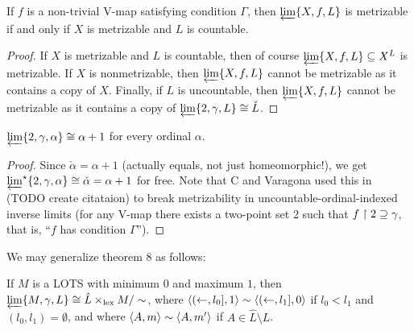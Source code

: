 \documentclass[11pt]{article}
\newcommand{\lexTimes}{\times_{\textrm{lex}}}
\begin{document}
  \begin{corollary}
    If \(f\) is a non-trivial V-map satisfying condition \(\Gamma\), then
    \(\varprojlim \{X, f, L\}\) is metrizable if and only if
    \(X\) is metrizable and \(L\) is countable.
  \end{corollary}

  \begin{proof}
    If \(X\) is metrizable and \(L\) is countable, then of course
    \(\varprojlim \{X,f,L\}\subseteq X^L\) is metrizable. If \(X\) is
    nonmetrizable, then \(\varprojlim \{X,f,L\}\) cannot be metrizable
    as it contains a copy of \(X\). Finally, if \(L\) is uncountable,
    then \(\varprojlim \{X,f,L\}\) cannot be metrizable as it
    contains a copy of \(\varprojlim \{2,\gamma,L\}\cong\check L\).
  \end{proof}

  \begin{corollary}
    \(
      \varprojlim \{2, \gamma, \alpha\}
      \cong
      \alpha+1
    \)
    for every ordinal \(\alpha\).
  \end{corollary}

  \begin{proof}
    Since \(\check\alpha=\alpha+1\) (actually equals, not just homeomorphic!),
    we get \(\varprojlim^\star \{2, \gamma, \alpha\}
      \cong \check\alpha =
    \alpha+1\) for free.
    Note that C and Varagona used this in (TODO create citataion) to break
    metrizability in uncountable-ordinal-indexed inverse limits (for any V-map
    there exists a two-point set \(2\) such that \(f\restriction 2\supseteq\gamma\),
    that is, ``\(f\) has condition \(\Gamma\)'').
  \end{proof}

  \bigskip

  We may generalize theorem 8 as follows:

  \begin{theorem}
    If \(M\) is a LOTS with minimum \(0\) and maximum \(1\),
    then \(\varprojlim\{M,\gamma,L\}\cong \hat L\lexTimes M/\sim\),
    where \(\langle(\leftarrow,l_0],1\rangle\sim\langle(\leftarrow,l_1],0\rangle\) if
    \(l_0<l_1\) and \((l_0,l_1)=\emptyset\),
    and where \(\langle A,m\rangle\sim\langle A,m'\rangle\) if \(A\in\hat L\setminus L\).
  \end{theorem}
\end{document}
